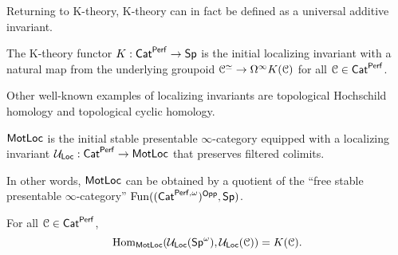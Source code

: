 Returning to K-theory, K-theory can in fact be defined as a universal additive invariant. 
\begin{theorem}\label{thm: initial localizing invariant}
    The K-theory functor $K:\mathsf{Cat}^{\mathsf{Perf}}\to\mathsf{Sp}$ is the initial localizing invariant with a natural map from the underlying groupoid $\EuScript{C}^{\simeq}\to\Omega^{\infty}K(\EuScript{C})$ for all $\EuScript{C}\in\mathsf{Cat}^{\mathsf{Perf}}$. 
\end{theorem}
Other well-known examples of localizing invariants are topological Hochschild homology and topological cyclic homology. 
\begin{definition}\label{def: localizing motives}
    $\mathsf{MotLoc}$ is the initial stable presentable $\infty$-category equipped with a localizing invariant $\mathcal{U}_{\mathsf{Loc}}:\mathsf{Cat}^{\mathsf{Perf}}\to\mathsf{MotLoc}$ that preserves filtered colimits. 
\end{definition}
In other words, $\mathsf{MotLoc}$ can be obtained by a quotient of the ``free stable presentable $\infty$-category'' $\mathrm{Fun}((\mathsf{Cat}^{\mathsf{Perf}, \omega})^{\mathsf{Opp}},\mathsf{Sp})$. 
\begin{theorem}\label{thm: localizingm motives is k theory}
    For all $\EuScript{C}\in\mathsf{Cat}^{\mathsf{Perf}}$, 
    $$\mathrm{Hom}_{\mathsf{MotLoc}}(\mathcal{U}_{\mathsf{Loc}}(\mathsf{Sp}^{\omega}), \mathcal{U}_{\mathsf{Loc}}(\EuScript{C}))=K(\EuScript{C}).$$
\end{theorem}